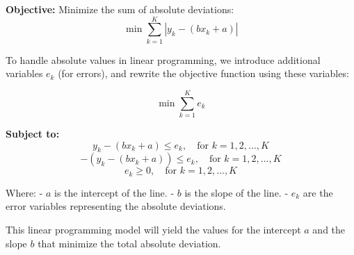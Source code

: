 \documentclass{article}
\begin{document}
\textbf{Objective:} Minimize the sum of absolute deviations:
\[
\min \sum_{k=1}^{K} |y_k - (bx_k + a)|
\]

To handle absolute values in linear programming, we introduce additional variables \( e_k \) (for errors), and rewrite the objective function using these variables:

\[
\min \sum_{k=1}^{K} e_k
\]

\textbf{Subject to:}
\[
y_k - (bx_k + a) \leq e_k, \quad \text{for } k = 1, 2, \ldots, K
\]
\[
-(y_k - (bx_k + a)) \leq e_k, \quad \text{for } k = 1, 2, \ldots, K
\]
\[
e_k \geq 0, \quad \text{for } k = 1, 2, \ldots, K
\]

Where:
- \( a \) is the intercept of the line.
- \( b \) is the slope of the line.
- \( e_k \) are the error variables representing the absolute deviations.

This linear programming model will yield the values for the intercept \( a \) and the slope \( b \) that minimize the total absolute deviation.
\end{document}
